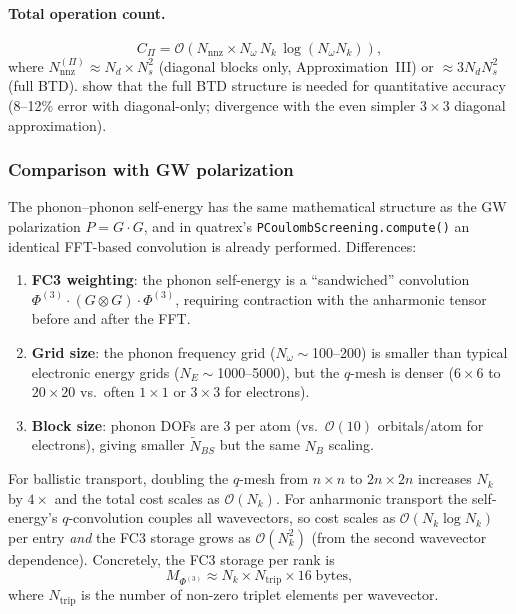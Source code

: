 \paragraph{Total operation count.}
\begin{equation}\label{eq:phph_cost}
  C_\Pi = \mathcal{O}\!\left(
    N_\mathrm{nnz} \times N_\omega\,N_k\,\log(N_\omega N_k)
  \right),
\end{equation}
where $N_\mathrm{nnz}^{(\Pi)} \approx N_d\times N_s^2$ (diagonal
blocks only, Approximation~III) or $\approx 3N_d N_s^2$ (full BTD).
\cite{guo_quantum_2020} show that the full BTD structure is needed for quantitative
accuracy (8--12\% error with diagonal-only; divergence with the even
simpler $3\times3$ diagonal approximation).

\subsubsection{Comparison with GW polarization}

The phonon--phonon self-energy has the same mathematical structure as
the GW polarization $P = G\cdot G$, and in quatrex's
\texttt{PCoulombScreening.compute()} an identical FFT-based convolution
is already performed.  Differences:
\begin{enumerate}
  \item \textbf{FC3 weighting}: the phonon self-energy is a
        ``sandwiched'' convolution
        $\Phi^{(3)}\cdot(G\otimes G)\cdot\Phi^{(3)}$, requiring
        contraction with the anharmonic tensor before and after the FFT.
  \item \textbf{Grid size}: the phonon frequency grid
        ($N_\omega\sim$100--200) is smaller than typical electronic
        energy grids ($N_E\sim$1000--5000), but the $q$-mesh is denser
        ($6\times6$ to $20\times20$ vs.\ often $1\times1$ or $3\times3$
        for electrons).
  \item \textbf{Block size}: phonon DOFs are 3 per atom (vs.\
        $\mathcal{O}(10)$ orbitals/atom for electrons), giving smaller
        $\widetilde{N}_{BS}$ but the same $N_B$ scaling.
\end{enumerate}

For ballistic transport, doubling the $q$-mesh from $n\times n$ to
$2n\times 2n$ increases $N_k$ by $4\times$ and the total cost scales
as $\mathcal{O}(N_k)$. For anharmonic transport the self-energy's $q$-convolution
couples all wavevectors, so cost scales as $\mathcal{O}(N_k\log N_k)$
per entry \emph{and} the FC3 storage grows as $\mathcal{O}(N_k^2)$
(from the second wavevector dependence).  Concretely, the FC3 storage
per rank is
\begin{equation}\label{eq:fc3_mem}
  M_{\Phi^{(3)}} \approx N_k \times N_\mathrm{trip} \times 16\;\text{bytes},
\end{equation}
where $N_\mathrm{trip}$ is the number of non-zero triplet elements per
wavevector.

